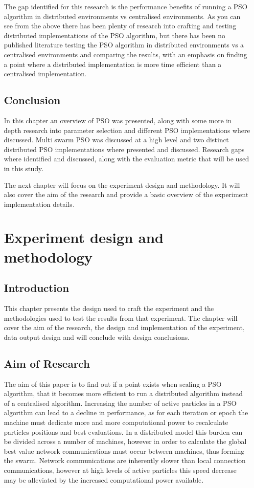 \documentclass[oneside,12pt]{book}
\begin{document}
The gap identified for this research is the performance benefits of running a PSO algorithm in distributed environments vs centralised environments. As you can see from the above there has been plenty of research into crafting and testing distributed implementations of the PSO algorithm, but there has been no published literature testing the PSO algorithm in distributed environments vs a centralised environments and comparing the results, with an emphasis on finding a point where a distributed implementation is more time efficient than a centralised implementation. 

\section{Conclusion}
In this chapter an overview of PSO was presented, along with some more in depth research into parameter selection and different PSO implementations where discussed. Multi swarm PSO was discussed at a high level and two distinct distributed PSO implementations where presented and discussed.
Research gaps where identified and discussed, along with the evaluation metric that will be used in this study. 

The next chapter will focus on the experiment design and methodology. It will also cover the aim of the research and provide a basic overview of the experiment implementation details.


\chapter{Experiment design and methodology}
\section{Introduction}
This chapter presents the design used to craft the experiment and the methodologies used to test the results from that experiment. The chapter will cover the aim of the research, the design and implementation of the experiment, data output design and will conclude with design conclusions. 
\section{Aim of Research}
The aim of this paper is to find out if a point exists when scaling a PSO algorithm, that it becomes more efficient to run a distributed algorithm instead of a centralised algorithm. Increasing the number of active particles in a PSO algorithm can lead to a decline in performance, as for each iteration or epoch the machine must dedicate more and more computational power to recalculate particles positions and best evaluations. In a distributed model this burden can be divided across a number of machines, however in order to calculate the global best value network communications must occur between machines, thus forming the swarm. Network communications are inherently slower than local connection communications, however at high levels of active particles this speed decrease may be alleviated by the increased computational power available. 
\end{document}
